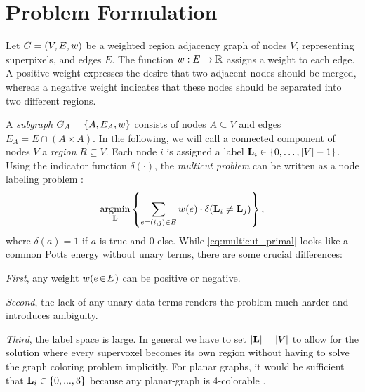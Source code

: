 \section{Problem Formulation\label{sec:problem_formulation}}
Let $G=(V,E, w)$ be a weighted region adjacency graph of
nodes $V$, representing superpixels,
and edges $E$.
%
The function $w : E \rightarrow \mathbb{R}$ assigns a weight to each edge.
A positive weight expresses the desire that two adjacent nodes should
be merged, whereas a negative weight indicates
that these nodes should be separated into two different regions.

A \emph{subgraph} $G_A = \{A, E_A, w\}$ consists
of nodes $A \subseteq V$ and edges $E_A = E\cap (A\times A)$.
%
In the following, we will call a connected component
of nodes $V$ a \emph{region} $R \subseteq V$.
%
Each node $i$ is assigned a 
label $\mathbf{L}_{i} \in \{0, \dots, | V |-1\}$. Using the indicator 
function
$\delta(\cdot)$, the
\emph{multicut problem} can be written as a node labeling problem
\cite{bagon_2011_arxiv}:
%
\begin{align}
\operatorname*{\arg\!\min}_{\mathbf{L}}
    \left\{
    \sum_{ e=(i,j) \in E}
        w(e)
        \cdot \delta( \mathbf{L}_i \neq \mathbf{L}_j )
    \right\},
    \label{eq:multicut_primal}
\end{align}
%
where $\delta(a) = 1$ if $a$ is true and $0$ else.
%
While \eqref{eq:multicut_primal} looks like a common Potts energy without
unary terms, there are some crucial differences:

\noindent
\emph{First}, any weight $w(e\!\in\!E)$ can be positive or negative.

\noindent
\emph{Second}, the lack of any unary data terms renders the problem much harder
and introduces ambiguity.

\noindent
\emph{Third}, the label space is large.
In general we have to set
$|\mathbf{L}| = |V|$ to allow for the solution
where every supervoxel becomes its own region
without having to solve the graph coloring problem implicitly.
For planar graphs, it would be sufficient that $\mathbf{L}_i \in \{0,...,3\}$
because any planar-graph is 4-colorable \cite{appel_1977_4color}.
%


